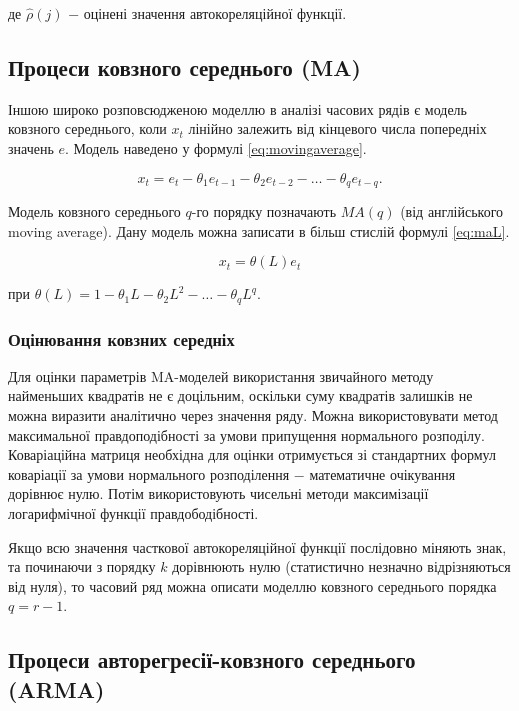 \noindent де $\hat{\rho}(j)$ $-$ оцінені значення автокореляційної функції.

\subsection{Процеси ковзного середнього (MA)}

Іншою широко розповсюдженою моделлю в аналізі часових рядів є модель ковзного середнього, коли $x_{t}$ лінійно залежить від кінцевого числа попередніх значень $e$. Модель наведено у формулі \ref{eq:movingaverage}.

\begin{equation}\label{eq:movingaverage}
x_{t} = e_{t} - \theta_{1}e_{t-1} - \theta_{2}e_{t-2} - \dots - \theta_{q}e_{t-q}.
\end{equation}

Модель ковзного середнього $q$-го порядку позначають $MA(q)$ (від англійського moving average). Дану модель можна записати в більш стислій формулі \ref{eq:maL}.

\begin{equation}\label{eq:maL}
x_{t} = \theta(L)e_{t}
\end{equation}

\noindent при $\theta(L) = 1 - \theta_{1}L - \theta_{2}L^{2} - \dots - \theta_{q}L^{q}$.

\subsubsection{Оцінювання ковзних середніх}

Для оцінки параметрів MA-моделей використання звичайного методу найменьших квадратів не є доцільним, оскільки суму квадратів залишків не можна виразити аналітично через значення ряду. Можна використовувати метод максимальної правдоподібності за умови припущення нормального розподілу. Коваріаційна матриця необхідна для оцінки отримується зі стандартних формул коваріації за умови нормального розподілення $-$ математичне очікування дорівнює нулю. Потім використовують чисельні методи максимізації логарифмічної функції правдободібності.

Якщо всю значення часткової автокореляційної функції послідовно міняють знак, та починаючи з порядку $k$ дорівнюють нулю (статистично незначно відрізняються від нуля), то часовий ряд можна описати моделлю ковзного середнього порядка $q=r-1$.

\subsection{Процеси авторегресії-ковзного середнього (ARMA)}

